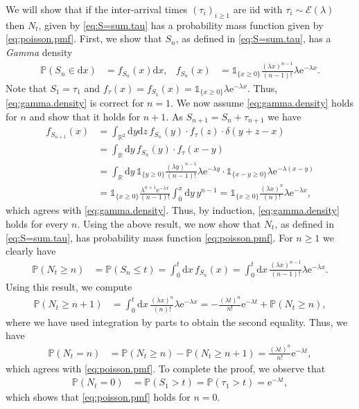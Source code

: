 \documentclass[12pt]{book}
\numberwithin{equation}{chapter}
\theoremstyle{plain}
\numberwithin{theorem}{section}
\theoremstyle{definition}
\numberwithin{exercise}{chapter}
\let\oldendproof\endproof
\renewenvironment{proof}[1][\proofname]{%
  \oldproof[\scshape\underline{#1}]%
}{\oldendproof}
\newcommand{\<}{\langle}
\renewcommand{\>}{\rangle}
\renewcommand{\(}{\left(}
\renewcommand{\)}{\right)}
\renewcommand{\[}{\left[}
\renewcommand{\]}{\right]}
\newcommand\Ib{\mathds{1}} 	%
\newcommand\Pb{\mathds{P}}
\newcommand\Rb{\mathds{R}}
\newcommand\Ec{\mathscr{E}}
\newcommand\lam{\lambda}
\newcommand\del{\delta}
\newcommand\dd{\mathrm{d}}
\newcommand\ee{\mathrm{e}}
\begin{document}
\begin{proof}
We will show that if the inter-arrival times $(\tau_i)_{i \geq 1}$ are iid with $\tau_i \sim \Ec(\lam)$ then $N_t$, given by \eqref{eq:S=sum.tau} has a probability mass function given by \eqref{eq:poisson.pmf}.
First, we show that $S_n$, as defined in \eqref{eq:S=sum.tau}, has a \emph{Gamma} density
\begin{align}
\Pb(S_n \in \dd x)
	&=	f_{S_n}(x) \dd x , &
f_{S_n}(x)
	&=	\Ib_{\{x \geq 0\}} \frac{(\lam x)^{n-1}}{(n-1)!}\lam \ee^{- \lam x} . \label{eq:gamma.density}
\end{align}
Note that $S_1 = \tau_1$ and $f_\tau(x) = f_{S_1}(x) = \Ib_{\{x \geq 0\}} \lam \ee^{- \lam x}$.  Thus, \eqref{eq:gamma.density} is correct for $n=1$.  We now assume \eqref{eq:gamma.density} holds for $n$ and show that it holds for $n+1$.  As $S_{n+1} = S_n + \tau_{n+1}$ we have
\begin{align}
f_{S_{n+1}}(x)
	&=	\int_{\Rb^2} \dd y \dd z \, f_{S_n}(y) \cdot f_{\tau}(z) \cdot \del(y+z-x) \\
	&=	\int_\Rb \dd y \, f_{S_n}(y) \cdot f_{\tau}(x-y) \\
	&=	\int_\Rb \dd y \, \Ib_{\{y \geq 0\}} \frac{(\lam y)^{n-1}}{(n-1)!}\lam \ee^{- \lam y} \cdot \Ib_{\{x-y \geq 0\}} \lam \ee^{- \lam (x-y)} \\
	&=	\Ib_{\{x \geq 0\}} \frac{\lam^{n+1}\ee^{- \lam x}}{(n-1)!} \int_0^x \dd y \, y^{n-1}
	=		\Ib_{\{x \geq 0\}}\frac{(\lam x)^{n}}{(n)!}\lam \ee^{- \lam x} ,
\end{align}
which agrees with \eqref{eq:gamma.density}.  Thus, by induction, \eqref{eq:gamma.density} holds for every $n$.
Using the above result, we now show that $N_t$, as defined in \eqref{eq:S=sum.tau}, has probability mass function \eqref{eq:poisson.pmf}.  For $n \geq 1$ we clearly have
\begin{align}
\Pb( N_t \geq  n )
	&=	\Pb( S_n \leq t )
	=		\int_0^t \dd x \, f_{S_n}(x) 
	= 	\int_0^t \dd x \, \frac{(\lam x)^{n-1}}{(n-1)!}\lam \ee^{- \lam x} .
\end{align}
Using this result, we compute
\begin{align}
\Pb( N_t \geq  n + 1 )
	&=	\int_0^t \dd x \, \frac{(\lam x)^{n}}{(n)!}\lam \ee^{- \lam x}
	=		- \frac{(\lam t)^n}{n!}\ee^{- \lam t} + \Pb( N_t \geq n ) ,
\end{align}
where we have used integration by parts to obtain the second equality.  Thus, we have
\begin{align}
\Pb( N_t = n )
	&=	\Pb( N_t \geq n) - \Pb(N_t \geq n+1) 
	=		\frac{(\lam t)^n}{n!}\ee^{- \lam t} ,
\end{align}
which agrees with \eqref{eq:poisson.pmf}.  To complete the proof, we observe that
\begin{align}
\Pb(N_t = 0)
	&=	\Pb( S_1 > t )
	=		\Pb( \tau_1 > t )
	=		\ee^{- \lam t} ,
\end{align}
which shows that \eqref{eq:poisson.pmf} holds for $n=0$.
\end{proof}
\end{document}
